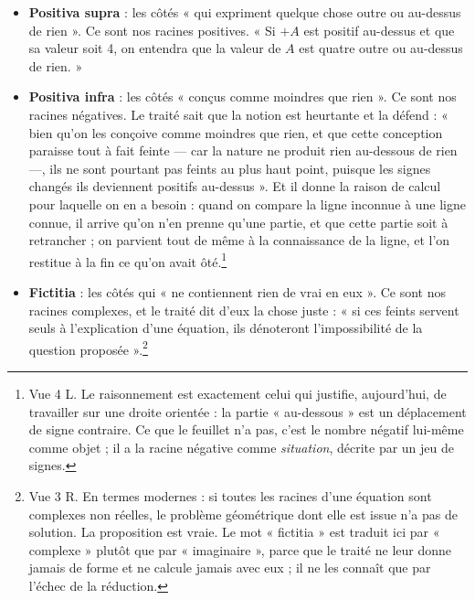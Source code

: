 \documentclass[11pt,a4paper]{article}
\begin{document}
\begin{itemize}
  \item \textbf{Positiva supra} : les côtés « qui expriment quelque chose outre
    ou au-dessus de rien ». Ce sont nos racines positives. « Si $+A$ est positif
    au-dessus et que sa valeur soit 4, on entendra que la valeur de $A$ est
    quatre outre ou au-dessus de rien. »
  \item \textbf{Positiva infra} : les côtés « conçus comme moindres que rien ».
    Ce sont nos racines négatives. Le traité sait que la notion est heurtante et
    la défend : « bien qu'on les conçoive comme moindres que rien, et que cette
    conception paraisse tout à fait feinte — car la nature ne produit rien
    au-dessous de rien —, ils ne sont pourtant pas feints au plus haut point,
    puisque les signes changés ils deviennent positifs au-dessus ». Et il donne
    la raison de calcul pour laquelle on en a besoin : quand on compare la ligne
    inconnue à une ligne connue, il arrive qu'on n'en prenne qu'une partie, et
    que cette partie soit à retrancher ; on parvient tout de même à la
    connaissance de la ligne, et l'on restitue à la fin ce qu'on avait
    ôté.\footnote{Vue 4 L. Le raisonnement est exactement celui qui justifie,
    aujourd'hui, de travailler sur une droite orientée : la partie
    « au-dessous » est un déplacement de signe contraire. Ce que le feuillet
    n'a pas, c'est le nombre négatif lui-même comme objet ; il a la racine
    négative comme \emph{situation}, décrite par un jeu de signes.}
  \item \textbf{Fictitia} : les côtés qui « ne contiennent rien de vrai en
    eux ». Ce sont nos racines complexes, et le traité dit d'eux la chose
    juste : « si ces feints servent seuls à l'explication d'une équation, ils
    dénoteront l'impossibilité de la question proposée ».\footnote{Vue 3 R. En
    termes modernes : si toutes les racines d'une équation sont complexes non
    réelles, le problème géométrique dont elle est issue n'a pas de solution. La
    proposition est vraie. Le mot « fictitia » est traduit ici par
    « complexe » plutôt que par « imaginaire », parce que le traité ne leur
    donne jamais de forme et ne calcule jamais avec eux ; il ne les connaît que
    par l'échec de la réduction.}
\end{itemize}
\end{document}
